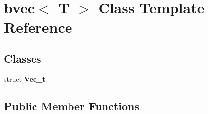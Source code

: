 \hypertarget{classbvec}{\section{bvec$<$ \-T $>$ \-Class \-Template \-Reference}
\label{classbvec}
}
\subsection*{\-Classes}
\begin{DoxyCompactItemize}
\item 
struct {\bfseries \-Vec\-\_\-t}
\end{DoxyCompactItemize}
\subsection*{\-Public \-Member \-Functions}
